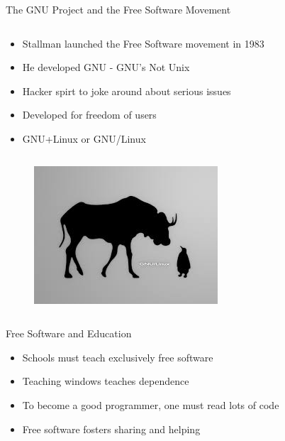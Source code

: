 \begin{frame}{The GNU Project and the Free Software Movement}
  \begin{column}{.45\textwidth}
    \begin{itemize}
      \item Stallman launched the Free Software movement in 1983
      \item He developed GNU - GNU's Not Unix
      \item Hacker spirt to joke around about serious issues
      \item Developed for freedom of users
      \item GNU+Linux or GNU/Linux
    \end{itemize}
  \end{column}
  \begin{column}{0.5\textwidth}\raggedleft{}
    \begin{figure}
      \includegraphics[width=\textwidth]{images/gnu-linux.jpg}
      \caption{\Protect\cite{gnuLinux}}
    \end{figure}
  \end{column}
\end{frame}


\begin{frame}{Free Software and Education}
  \begin{itemize}
    \item Schools must teach exclusively free software
    \item Teaching windows teaches dependence
    \item To become a good programmer, one must read lots of code
    \item Free software fosters sharing and helping
  \end{itemize}
\end{frame}


